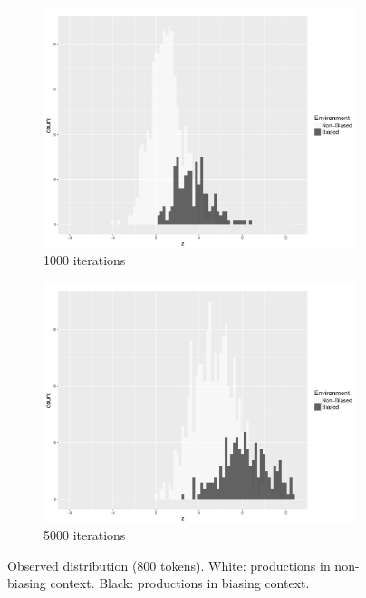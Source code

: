 \begin{figure}[H]
\begin{subfigure}[t]{.5\textwidth}
        \includegraphics[width=\linewidth]{figures/1000iter.pdf}
        \caption{1000 iterations}
    \end{subfigure}%
    \begin{subfigure}[t]{.5\textwidth}
        \includegraphics[width=\linewidth]{figures/5000iter.pdf}
        \caption{5000 iterations}
    \end{subfigure}
    

\caption{\label{fig:End context mismatch}Observed distribution (800 tokens).
White: productions in non-biasing context. Black: productions in biasing
context.}
\end{figure}

